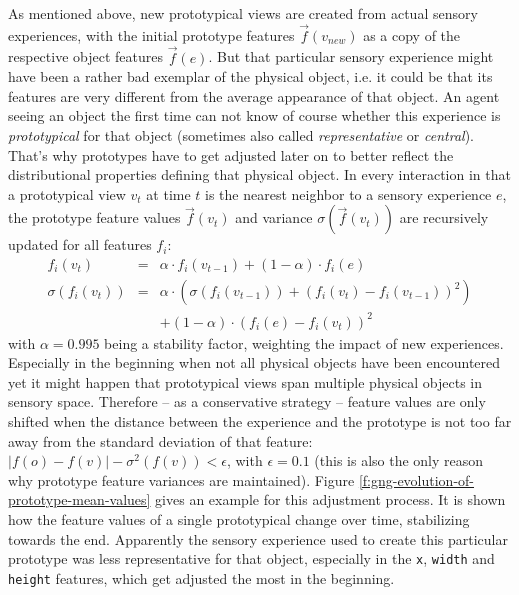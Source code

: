 As mentioned above, new prototypical views are created from actual
sensory experiences, with the initial prototype features
$\vec{f}(v_{new})$ as a copy of the respective object features
$\vec{f}(e)$. But that particular sensory experience might have been a
rather bad exemplar of the physical object, i.e. it could be that its
features are very different from the average appearance of that
object. An agent seeing an object the first time can not know of
course whether this experience is \emph{prototypical}
\citep{rosch75family-resemblances} for that object (sometimes also
called \emph{representative} or \emph{central}). That's why prototypes
have to get adjusted later on to better reflect the distributional
properties defining that physical object. In every interaction in that
a prototypical view $v_t$ at time $t$ is the nearest neighbor to a
sensory experience $e$, the prototype feature values $\vec{f}(v_t)$
and variance $\sigma\left(\vec{f}(v_t)\right)$ are recursively updated
for all features $f_i$:
\begin{eqnarray*}f_i(v_t) & = & \alpha \cdot f_i(v_{t-1}) + \left(1 - \alpha\right) \cdot f_i(e) \\
  \sigma\left(f_i(v_t)\right) & = & \alpha \cdot
  \left(\sigma\left(f_i(v_{t-1})\right) + \left(f_i(v_t) -
      f_i(v_{t-1})\right)^2\right) \\
   & & + \left(1 - \alpha\right) \cdot
  \left(f_i(e) - f_i(v_t)\right)^2\end{eqnarray*} with $\alpha=0.995$
being a stability factor, weighting the impact of new experiences.
Especially in the beginning when not all physical objects have been
encountered yet it might happen that prototypical views span multiple
physical objects in sensory space. Therefore -- as a conservative
strategy -- feature values are only shifted when the distance between
the experience and the prototype is not too far away from the standard
deviation of that feature: $|f(o)-f(v)|-\sigma^2\left(f(v)\right) <
\epsilon$, with $\epsilon = 0.1$ (this is also the only reason why
prototype feature variances are maintained). Figure
\ref{f:gng-evolution-of-prototype-mean-values} gives an example for
this adjustment process. It is shown how the feature values of a
single prototypical change over time, stabilizing towards the
end. Apparently the sensory experience used to create this particular
prototype was less representative for that object, especially in the
{\tt x}, {\tt width} and {\tt height} features, which get adjusted the
most in the beginning.

